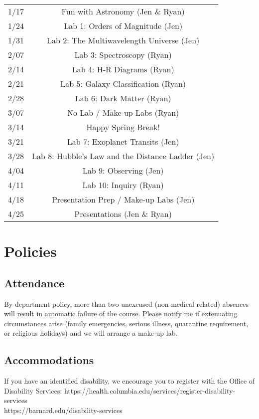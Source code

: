 \documentclass[11pt]{article}
\begin{document}
\begin{tabular}{cc}
    1/17 & Fun with Astronomy (Jen \& Ryan)\\ %
    1/24 & Lab 1: Orders of Magnitude (Jen)\\ %
    1/31 & Lab 2: The Multiwavelength Universe (Jen)\\ %
    2/07 & Lab 3: Spectroscopy (Ryan)\\ %
    2/14 & Lab 4: H-R Diagrams (Ryan)\\ %
    2/21 & Lab 5: Galaxy Classification (Ryan)\\ %
    2/28 & Lab 6: Dark Matter (Ryan)\\ %
    3/07 & No Lab / Make-up Labs (Ryan)\\ %
    3/14 & Happy Spring Break!\\
    3/21 & Lab 7: Exoplanet Transits (Jen)\\ %
    3/28 & Lab 8: Hubble's Law and the Distance Ladder (Jen)\\ %
    4/04 & Lab 9: Observing (Jen)\\ %
    4/11 & Lab 10: Inquiry (Ryan)\\ %
    4/18 & Presentation Prep / Make-up Labs (Jen)\\ %
    4/25 & Presentations (Jen \& Ryan)\\ %
\end{tabular}

\section*{Policies}
 
\subsection*{Attendance}
 
By department policy, more than two unexcused (non-medical related) absences will result in automatic failure of the course. Please notify me if  extenuating circumstances arise (family emergencies, serious illness, quarantine requirement, or religious holidays) and we will arrange a make-up lab.
 
\subsection*{Accommodations}
If you have an identified disability, we encourage you to register with the Office of Disability Services: https://health.columbia.edu/services/register-disability-services \\ https://barnard.edu/disability-services
 
\end{document}
